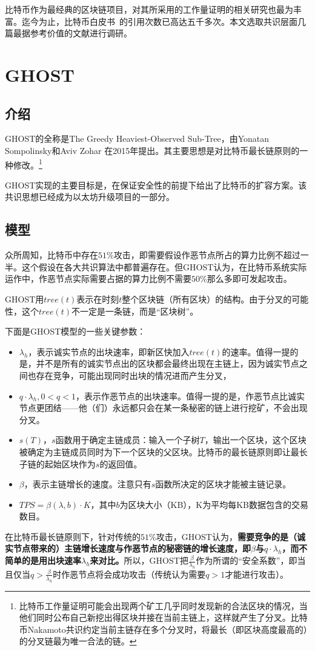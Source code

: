 比特币作为最经典的区块链项目，对其所采用的工作量证明的相关研究也最为丰富。迄今为止，比特币白皮书~\cite{nakamoto2008bitcoin}的引用次数已高达五千多次。本文选取共识层面几篇最据参考价值的文献进行调研。
\section{GHOST}
\subsection{介绍}
GHOST的全称是The Greedy Heaviest-Observed Sub-Tree，由Yonatan Sompolinsky和Aviv Zohar 在2015年提出\cite{sompolinsky2015secure}。其主要思想是对比特币最长链原则的一种修改。\footnote{比特币工作量证明可能会出现两个矿工几乎同时发现新的合法区块的情况，当他们同时公布自己新挖出得区块并接在当前主链上，这样就产生了分叉。比特币Nakamoto共识约定当前主链存在多个分叉时，将最长（即区块高度最高的）的分叉链最为唯一合法的链。}	

GHOST实现的主要目标是，在保证安全性的前提下给出了比特币的扩容方案。该共识思想已经成为以太坊升级项目的一部分。

\subsection{模型}
众所周知，比特币中存在$51\%$攻击，即需要假设作恶节点所占的算力比例不超过一半。这个假设在各大共识算法中都普遍存在。但GHOST认为，在比特币系统实际运作中，作恶节点实际需要占据的算力比例不需要$50\%$那么多即可发起攻击。


GHOST用$tree(t)$表示在时刻$t$整个区块链（所有区块）的结构。由于分叉的可能性，这个$tree(t)$不一定是一条链，而是“区块树”。

下面是GHOST模型的一些关键参数：
\begin{itemize}
	\item $\lambda_h$，表示诚实节点的出块速率，即新区快加入$tree(t)$的速率。值得一提的是，并不是所有的诚实节点出的区块都会最终出现在主链上，因为诚实节点之间也存在竞争，可能出现同时出块的情况进而产生分叉，
	\item $q\cdot\lambda_h,0<q<1$，表示作恶节点的出块速率。值得一提的是，作恶节点比诚实节点更团结——他（们）永远都只会在某一条秘密的链上进行挖矿，不会出现分叉。
	\item $s(T)$，$s$函数用于确定主链成员：输入一个子树$T$，输出一个区块，这个区块被确定为主链成员同时为下一个区块的父区块。比特币的最长链原则即让最长子链的起始区块作为$s$的返回值。
	\item $\beta$，表示主链增长的速度。注意只有$s$函数所决定的区块才能被主链记录。
	\item $TPS=\beta(\lambda,b)\cdot K$，其中$b$为区块大小（KB），K为平均每KB数据包含的交易数目。
\end{itemize}
在比特币最长链原则下，针对传统的$51\%$攻击，GHOST认为，\textbf{需要竞争的是（诚实节点带来的）主链增长速度与作恶节点的秘密链的增长速度，即$\beta$与$q\cdot\lambda_h$，而不简单的是用出块速率$\lambda_h$来对比。}所以，GHOST把$\frac{\beta}{\lambda_h}$作为所谓的“安全系数”，即当且仅当$q>\frac{\beta}{\lambda_h}$时作恶节点将会成功攻击（传统认为需要$q>1$才能进行攻击）。
	
